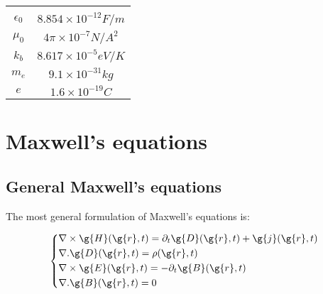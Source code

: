 %
\vspace{0.3 in}

\noindent {}
\begin{center}
\begin{tabular}{cc} 
\hline
 & \\
$\epsilon_0$                         & $8.854\times 10^{-12} F/m$ \\[10pt]
$\mu_0$          & $4\pi \times 10^{-7} N/A^2$ \\[10pt]
$k_b$                 & $8.617 \times 10^{-5} eV/K$ \\[10pt]         
$m_e$                 & $9.1 \times 10^{-31} kg$  \\[10pt]                  
$e$                 & $1.6 \times 10^{-19}C $  \\[10pt]
\hline
\end{tabular}
\end{center}





\section{Maxwell's equations}



\subsection{General Maxwell's equations}

\noindent The most general formulation of Maxwell's equations is:


\begin{equation}
\label{eq:Maxwell-Equations-generalForm}
  \left\{
      \begin{aligned}
     & \nabla \times \g{H}(\g{r},t) = \partial_t\g{ D}(\g{r},t)  + \g{j}(\g{r},t) \\
     &  \nabla . \g{D}(\g{r},t) = \rho(\g{r},t) \\
     & \nabla\times \g{E}(\g{r},t) = -\partial_t \g{B}(\g{r},t) \\ 
    & \nabla . \g{B}(\g{r},t) = 0\\
      \end{aligned}
    \right.
\end{equation}


